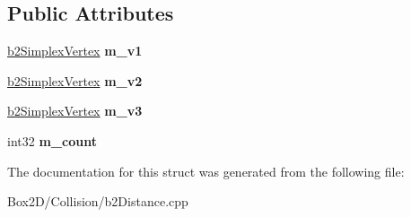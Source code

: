 \subsection*{Public Attributes}
\begin{DoxyCompactItemize}
\item 
\mbox{\label{structb2_simplex_a974d030fe572112e6d5212520586eb13}} 
\hyperlink{structb2_simplex_vertex}{b2\+Simplex\+Vertex} {\bfseries m\+\_\+v1}
\item 
\mbox{\label{structb2_simplex_a1732c0f9d63e7cdbd405e7a7b2c7b7cb}} 
\hyperlink{structb2_simplex_vertex}{b2\+Simplex\+Vertex} {\bfseries m\+\_\+v2}
\item 
\mbox{\label{structb2_simplex_a42ede9ec641aea34e51baf1b43e9ea07}} 
\hyperlink{structb2_simplex_vertex}{b2\+Simplex\+Vertex} {\bfseries m\+\_\+v3}
\item 
\mbox{\label{structb2_simplex_ad11c352a25ee324f438515fb8028bd23}} 
int32 {\bfseries m\+\_\+count}
\end{DoxyCompactItemize}


The documentation for this struct was generated from the following file\+:\begin{DoxyCompactItemize}
\item 
Box2\+D/\+Collision/b2\+Distance.\+cpp\end{DoxyCompactItemize}
